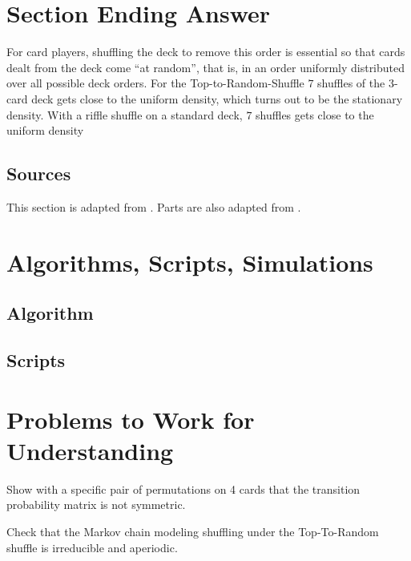 \documentclass[12pt]{article}
\begin{document}
\section*{Section Ending Answer}

For card players, shuffling the deck to remove this order
is essential so that cards dealt from the deck come ``at random'',
that is, in an order uniformly distributed over all possible deck
orders.  For the Top-to-Random-Shuffle \( 7 \) shuffles of the 3-card deck gets close to the
uniform density, which turns out to be the stationary density. With a
riffle shuffle on a standard deck, \( 7 \) shuffles gets close to the
uniform density

\subsection*{Sources} This section is adapted from
\cite{mann94}.  Parts are also adapted from
\cite{aldous86}.

\hr

\section*{Algorithms, Scripts, Simulations}

\subsection*{Algorithm}

\subsection*{Scripts}

% 

\hr

\section*{Problems to Work for Understanding}
\begin{exercise}
  Show with a specific pair of permutations on 4 cards that the
  transition probability matrix is not symmetric.
\end{exercise}
\begin{solution}
  
\end{solution}
\begin{exercise}
  Check  that the Markov chain modeling shuffling under the
  Top-To-Random shuffle is irreducible and aperiodic.
\end{exercise}
\begin{solution}
  
\end{solution}
\end{document}

